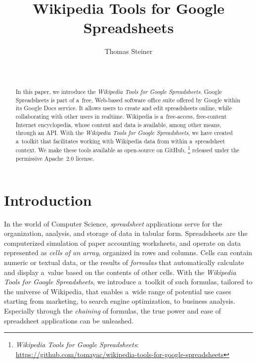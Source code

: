 \documentclass{sig-alternate-05-2015}
\newcommand{\inlinelistingsize}{\fontsize{8pt}{11pt}}
\let\oldurl\url
\renewcommand{\url}[1]{\inlinelistingsize\oldurl{#1}}
\begin{document}
\title{Wikipedia Tools for Google Spreadsheets}


\author{
\alignauthor
Thomas Steiner\\
       \\
       \\
}

\maketitle
\begin{abstract}
In this paper, we introduce the \emph{Wikipedia Tools for Google Spreadsheets}.
Google Spreadsheets is part of a~free, Web-based software office suite
offered by Google within its Google Docs service.
It allows users to create and edit spreadsheets online,
while collaborating with other users in realtime.
Wikipedia is a~free-access, free-content Internet encyclopedia,
whose content and data is available, among other means, through an API.
With the \emph{Wikipedia Tools for Google Spreadsheets}, we have created a~toolkit
that facilitates working with Wikipedia data from within a~spreadsheet context.
We make these tools available as open-source on GitHub,%
\footnote{\emph{Wikipedia Tools for Google Spreadsheets}:
\url{https://github.com/tomayac/wikipedia-tools-for-google-spreadsheets}}
released under the permissive Apache~2.0 license.
\end{abstract}



\section{Introduction}

In the world of Computer Science, \emph{spreadsheet} applications
serve for the organization, analysis, and storage of data in tabular form.
Spreadsheets are the computerized simulation of paper accounting worksheets,
and operate on data represented as \emph{cells of an array},
organized in rows and columns.
Cells can contain numeric or textual data, or the results of \emph{formulas}
that automatically calculate and display a~value based on the contents of other cells.
With the \emph{Wikipedia Tools for Google Spreadsheets},
we introduce a~toolkit of such formulas, tailored to the universe of Wikipedia,
that enables a~wide range of potential use cases
starting from marketing, to search engine optimization, to business analysis.
Especially through the \emph{chaining} of formulas, the true power and ease of spreadsheet
applications can be unleashed.
\end{document}
